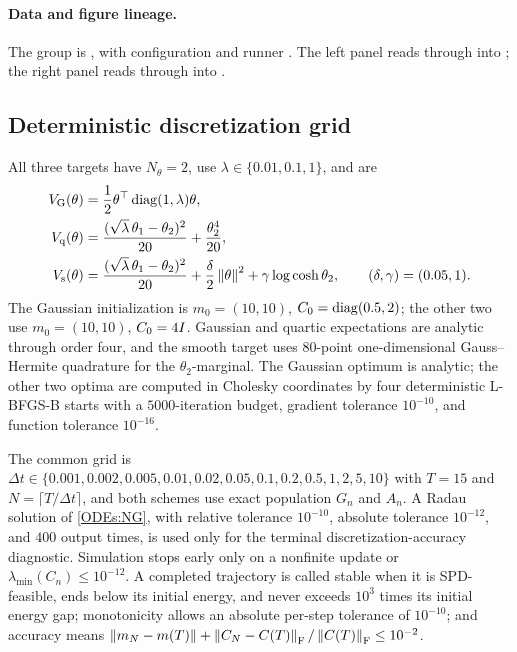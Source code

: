 \paragraph{Data and figure lineage.}
\begingroup\small\raggedright
The group is , with configuration
 and runner . The left
panel reads 
through  into
; the right panel reads
through  into
.
\par\endgroup

\subsection{Deterministic discretization grid}

All three targets have $N_\theta = 2$, use $\lambda\in\{0.01,0.1,1\}$, and are
\begin{align*}
  V_{\rm G}(\theta) &= \frac12\theta^\top\operatorname{diag}(1,\lambda)\theta,\\
  V_{\rm q}(\theta) &= \frac{(\sqrt\lambda\,\theta_1-\theta_2)^2}{20}
    + \frac{\theta_2^4}{20},\\
  V_{\rm s}(\theta) &= \frac{(\sqrt\lambda\,\theta_1-\theta_2)^2}{20}
    + \frac{\delta}{2}\left\lVert \theta\right\rVert^2 + \gamma\log\cosh\theta_2,
  \qquad (\delta,\gamma) = (0.05,1).
\end{align*}
The Gaussian initialization is $m_0 = (10,10)$, $C_0 = \operatorname{diag}(0.5,2)$; the other
two use $m_0 = (10,10)$, $C_0 = 4I$. Gaussian and quartic expectations are
analytic through order four, and the smooth target uses $80$-point
one-dimensional Gauss--Hermite quadrature for the $\theta_2$-marginal. The
Gaussian optimum is analytic; the other two optima are computed in Cholesky
coordinates by four deterministic L-BFGS-B starts with a $5000$-iteration
budget, gradient tolerance $10^{-10}$, and function tolerance $10^{-16}$.

The common grid is
$\Delta t\in\{0.001,0.002,0.005,0.01,0.02,0.05,0.1,0.2,0.5,1,2,5,10\}$ with
$T = 15$ and $N = \lceil T/\Delta t\rceil$, and both schemes use exact
population $G_n$ and $A_n$. A Radau solution of \eqref{ODEs:NG}, with relative
tolerance $10^{-10}$, absolute tolerance $10^{-12}$, and $400$ output times, is
used only for the terminal discretization-accuracy diagnostic. Simulation stops
early only on a nonfinite update or $\lambda_{\min}(C_n)\leq10^{-12}$. A
completed trajectory is called stable when it is SPD-feasible, ends below its
initial energy, and never exceeds $10^3$ times its initial energy gap;
monotonicity allows an absolute per-step tolerance of $10^{-10}$; and accuracy
means
$\left\lVert m_N-m(T)\right\rVert +
\left\lVert C_N-C(T)\right\rVert_{\mathrm{F}}/\left\lVert C(T)\right\rVert_{\mathrm{F}}\leq10^{-2}$.

